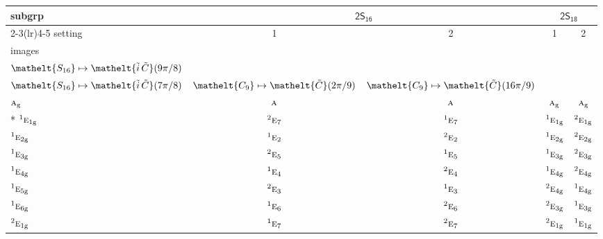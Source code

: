 \documentclass[10pt,a4paper]{article}
\numberwithin{equation}{section}
\newcommand{\eltfont}[1]{{\let\sigma\eltsigma\mathelt{#1}}}
\newcommand{\grp}[1]{\mathsf{#1}}
\newcommand{\irr}[1]{\text{\normalfont\scshape #1}}
\newcommand{\conjpair}[1]{{}^{#1}}
\newcommand{\cls}[1]{\eltfont{#1}}
\newcommand{\elt}[1]{\eltfont{#1}}
\newcommand{\ptag}[1]{\mathrm{#1}}
\newcommand{\lift}[1]{\tilde{#1}}
\begin{document}
{\small\begin{longtable}{@{}lcccc@{}}\toprule
subgrp & \multicolumn{2}{c}{\href{2S16.pdf}{$\grp{2S_{16}}$}} & \multicolumn{2}{c}{\href{2S18.pdf}{$\grp{2S_{18}}$}}\\\cmidrule(lr){2-3}\cmidrule(lr){4-5}
setting & 1 & 2 & 1 & 2\\
images & {\scriptsize\begin{tabular}[t]{@{}c@{}}$\cls{C_{8}} \mapsto \elt{\lift{C}}(\pi/4)$\\$\cls{S_{16}} \mapsto \elt{\lift{i}\,\lift{C}}(9\pi/8)$\end{tabular}} & {\scriptsize\begin{tabular}[t]{@{}c@{}}$\cls{C_{8}} \mapsto \elt{\lift{C}}(7\pi/4)$\\$\cls{S_{16}} \mapsto \elt{\lift{i}\,\lift{C}}(7\pi/8)$\end{tabular}} & {\scriptsize $\cls{C_{9}} \mapsto \elt{\lift{C}}(2\pi/9)$} & {\scriptsize $\cls{C_{9}} \mapsto \elt{\lift{C}}(16\pi/9)$}\\\midrule\endhead
\bottomrule\endfoot\endlastfoot
$\irr{a}_{\ptag{g}}$ & $\irr{a}$ & $\irr{a}$ & $\irr{a}_{\ptag{g}}$ & $\irr{a}_{\ptag{g}}$\\*
$\conjpair{1}\irr{e}_{1\ptag{g}}$ & $\conjpair{2}\irr{e}_{7}$ & $\conjpair{1}\irr{e}_{7}$ & $\conjpair{1}\irr{e}_{1\ptag{g}}$ & $\conjpair{2}\irr{e}_{1\ptag{g}}$\\
$\conjpair{1}\irr{e}_{2\ptag{g}}$ & $\conjpair{1}\irr{e}_{2}$ & $\conjpair{2}\irr{e}_{2}$ & $\conjpair{1}\irr{e}_{2\ptag{g}}$ & $\conjpair{2}\irr{e}_{2\ptag{g}}$\\
$\conjpair{1}\irr{e}_{3\ptag{g}}$ & $\conjpair{2}\irr{e}_{5}$ & $\conjpair{1}\irr{e}_{5}$ & $\conjpair{1}\irr{e}_{3\ptag{g}}$ & $\conjpair{2}\irr{e}_{3\ptag{g}}$\\
$\conjpair{1}\irr{e}_{4\ptag{g}}$ & $\conjpair{1}\irr{e}_{4}$ & $\conjpair{2}\irr{e}_{4}$ & $\conjpair{1}\irr{e}_{4\ptag{g}}$ & $\conjpair{2}\irr{e}_{4\ptag{g}}$\\
$\conjpair{1}\irr{e}_{5\ptag{g}}$ & $\conjpair{2}\irr{e}_{3}$ & $\conjpair{1}\irr{e}_{3}$ & $\conjpair{2}\irr{e}_{4\ptag{g}}$ & $\conjpair{1}\irr{e}_{4\ptag{g}}$\\
$\conjpair{1}\irr{e}_{6\ptag{g}}$ & $\conjpair{1}\irr{e}_{6}$ & $\conjpair{2}\irr{e}_{6}$ & $\conjpair{2}\irr{e}_{3\ptag{g}}$ & $\conjpair{1}\irr{e}_{3\ptag{g}}$\\
$\conjpair{2}\irr{e}_{1\ptag{g}}$ & $\conjpair{1}\irr{e}_{7}$ & $\conjpair{2}\irr{e}_{7}$ & $\conjpair{2}\irr{e}_{1\ptag{g}}$ & $\conjpair{1}\irr{e}_{1\ptag{g}}$\\

\end{longtable}}
\end{document}

